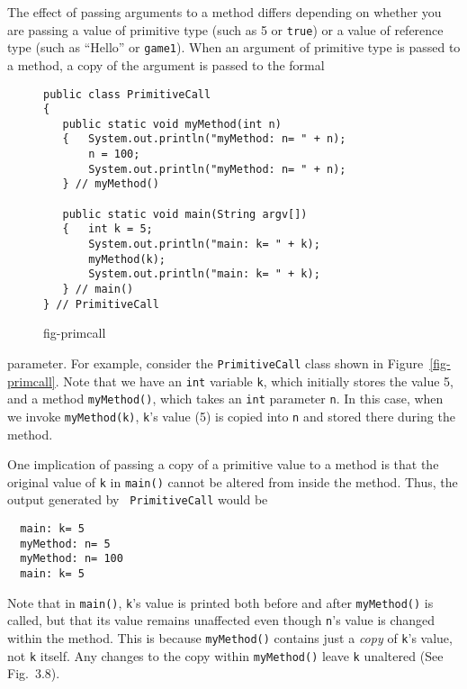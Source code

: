 \noindent The effect of passing arguments to a method differs depending on
whether you are passing a value of primitive type (such as 5 or {\tt true}) or a value of reference
type (such as ``Hello'' or {\tt game1}).  When
an argument of primitive type is
passed to a method, a copy of the argument is passed to the formal
\begin{figure}[h!]
\jjjprogstart
\begin{jjjlisting}
\begin{lstlisting}
public class PrimitiveCall
{
   public static void myMethod(int n)
   {   System.out.println("myMethod: n= " + n);
       n = 100;
       System.out.println("myMethod: n= " + n);
   } // myMethod()

   public static void main(String argv[])
   {   int k = 5;
       System.out.println("main: k= " + k);
       myMethod(k);
       System.out.println("main: k= " + k);
   } // main()
} // PrimitiveCall
\end{lstlisting}
\end{jjjlisting}
{fig-primcall}
\end{figure}
parameter.  For example, consider the \mbox{\tt PrimitiveCall} class
shown in Figure~\ref{fig-primcall}. Note that we have an {\tt int}
variable {\tt k}, which initially stores the value 5, and a method
{\tt myMethod()}, which takes an {\tt int} parameter {\tt n}.  In this
case, when we invoke {\tt myMethod(k)}, {\tt k}'s value (5) is copied
into {\tt n} and stored there during the method.


One implication of passing a copy of a primitive value to a method is that the
original value of {\tt k} in {\tt main()} cannot be altered from
inside the method.  Thus, the output generated by {\tt
PrimitiveCall} would be

\begin{jjjlisting}
\begin{lstlisting}
  main: k= 5
  myMethod: n= 5
  myMethod: n= 100
  main: k= 5
\end{lstlisting}
\end{jjjlisting}

\noindent Note that in {\tt main()}, {\tt k}'s value is
printed both before and after {\tt myMethod()} is called, but that its
value remains unaffected even though {\tt n}'s value is changed within
the method. This is because {\tt myMethod()} contains just a {\it
copy} of {\tt k}'s value, not {\tt k} itself. Any changes to the copy
within {\tt myMethod()} leave {\tt k} unaltered (See Fig.~3.8).

